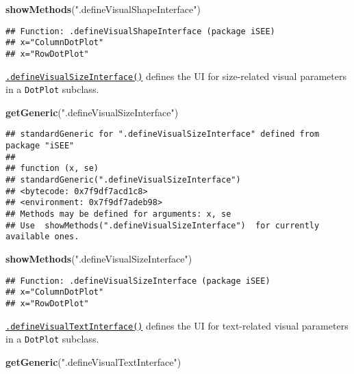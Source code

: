 \documentclass[
]{book}
\newenvironment{Shaded}{\begin{snugshade}}{\end{snugshade}}
\newcommand{\KeywordTok}[1]{\textcolor[rgb]{0.13,0.29,0.53}{\textbf{#1}}}
\newcommand{\NormalTok}[1]{#1}
\newcommand{\StringTok}[1]{\textcolor[rgb]{0.31,0.60,0.02}{#1}}
\begin{document}
\begin{Shaded}
\begin{Highlighting}[]
\KeywordTok{showMethods}\NormalTok{(}\StringTok{".defineVisualShapeInterface"}\NormalTok{)}
\end{Highlighting}
\end{Shaded}

\begin{verbatim}
## Function: .defineVisualShapeInterface (package iSEE)
## x="ColumnDotPlot"
## x="RowDotPlot"
\end{verbatim}

\href{https://isee.github.io/iSEE/reference/visual-parameters-generics.html}{\texttt{.defineVisualSizeInterface()}} defines the UI for size-related visual parameters in a \texttt{DotPlot} subclass.

\begin{Shaded}
\begin{Highlighting}[]
\KeywordTok{getGeneric}\NormalTok{(}\StringTok{".defineVisualSizeInterface"}\NormalTok{)}
\end{Highlighting}
\end{Shaded}

\begin{verbatim}
## standardGeneric for ".defineVisualSizeInterface" defined from package "iSEE"
## 
## function (x, se) 
## standardGeneric(".defineVisualSizeInterface")
## <bytecode: 0x7f9df7acd1c8>
## <environment: 0x7f9df7adeb98>
## Methods may be defined for arguments: x, se
## Use  showMethods(".defineVisualSizeInterface")  for currently available ones.
\end{verbatim}

\begin{Shaded}
\begin{Highlighting}[]
\KeywordTok{showMethods}\NormalTok{(}\StringTok{".defineVisualSizeInterface"}\NormalTok{)}
\end{Highlighting}
\end{Shaded}

\begin{verbatim}
## Function: .defineVisualSizeInterface (package iSEE)
## x="ColumnDotPlot"
## x="RowDotPlot"
\end{verbatim}

\href{https://isee.github.io/iSEE/reference/visual-parameters-generics.html}{\texttt{.defineVisualTextInterface()}} defines the UI for text-related visual parameters in a \texttt{DotPlot} subclass.

\begin{Shaded}
\begin{Highlighting}[]
\KeywordTok{getGeneric}\NormalTok{(}\StringTok{".defineVisualTextInterface"}\NormalTok{)}
\end{Highlighting}
\end{Shaded}
\end{document}
